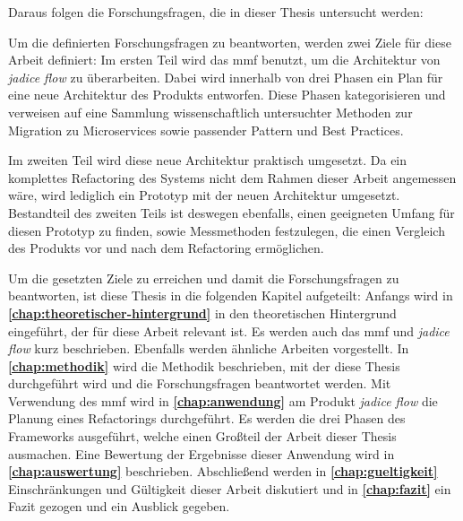 Daraus folgen die Forschungsfragen, die in dieser Thesis untersucht werden:


Um die definierten Forschungsfragen zu beantworten, werden zwei Ziele für diese Arbeit definiert:
Im ersten Teil wird das \gls{mmf} benutzt, um die Architektur von \emph{jadice flow} zu überarbeiten.
Dabei wird innerhalb von drei Phasen ein Plan für eine neue Architektur des Produkts entworfen.
Diese Phasen kategorisieren und verweisen auf eine Sammlung wissenschaftlich untersuchter Methoden zur Migration zu Microservices sowie passender Pattern und Best Practices.

Im zweiten Teil wird diese neue Architektur praktisch umgesetzt.
Da ein komplettes Refactoring des Systems nicht dem Rahmen dieser Arbeit angemessen wäre, wird lediglich ein Prototyp mit der neuen Architektur umgesetzt.
Bestandteil des zweiten Teils ist deswegen ebenfalls, einen geeigneten Umfang für diesen Prototyp zu finden, sowie Messmethoden festzulegen, die einen Vergleich des Produkts vor und nach dem Refactoring ermöglichen.

Um die gesetzten Ziele zu erreichen und damit die Forschungsfragen zu beantworten, ist diese Thesis in die folgenden Kapitel aufgeteilt:
Anfangs wird in \textbf{\cref{chap:theoretischer-hintergrund}} in den theoretischen Hintergrund eingeführt, der für diese Arbeit relevant ist. 
Es werden auch das \gls{mmf} und \emph{jadice flow} kurz beschrieben. 
Ebenfalls werden ähnliche Arbeiten vorgestellt.
In \textbf{\cref{chap:methodik}} wird die Methodik beschrieben, mit der diese Thesis durchgeführt wird und die Forschungsfragen beantwortet werden.
Mit Verwendung des \gls{mmf} wird in \textbf{\cref{chap:anwendung}} am Produkt \emph{jadice flow} die Planung eines Refactorings durchgeführt. 
Es werden die drei Phasen des Frameworks ausgeführt, welche einen Großteil der Arbeit dieser Thesis ausmachen. 
Eine Bewertung der Ergebnisse dieser Anwendung wird in \textbf{\cref{chap:auswertung}} beschrieben.
Abschließend werden in \textbf{\cref{chap:gueltigkeit}} Einschränkungen und Gültigkeit dieser Arbeit diskutiert und in \textbf{\cref{chap:fazit}} ein Fazit gezogen und ein Ausblick gegeben.  
